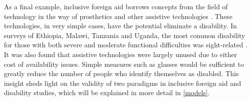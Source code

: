 \documentclass[a4paper]{article}
\begin{document}
As a final example, inclusive foreign aid borrows concepts from the field of
technology in the way of prosthetics and other assistive technologies
\citep{roulstone2016disability}. These technologies, in very simple cases,
have the potential eliminate a disability. In surveys of Ethiopia, Malawi,
Tanzania and Uganda, the most common disability for those with both severe and
moderate functional difficulties was sight-related
\citep{mitra2018disability}. It was also found that assistive technologies
were largely unused due to either cost of availability issues. Simple measures
such as glasses would be sufficient to greatly reduce the number of people who
identify themselves as disabled. This insight sheds light on the validity of
two paradigms in inclusive foreign aid and disability studies, which will be
explained in more detail in \autoref{models}.







\cleardoublepage


%
%

\end{document}
